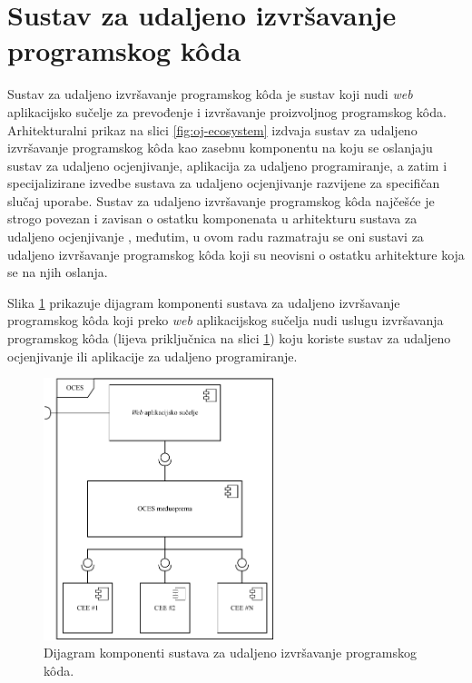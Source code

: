 \documentclass[times, utf8, diplomski]{fer}
\begin{document}
\pagebreak

\section{Sustav za udaljeno izvršavanje programskog kôda}
Sustav za udaljeno izvršavanje programskog kôda je sustav koji nudi \textit{web} aplikacijsko sučelje  za prevođenje i izvršavanje proizvoljnog programskog kôda. Arhitekturalni prikaz na slici \ref{fig:oj-ecosystem} izdvaja sustav za udaljeno izvršavanje programskog kôda kao zasebnu komponentu na koju se oslanjaju sustav za udaljeno ocjenjivanje, aplikacija za udaljeno programiranje, a zatim i specijalizirane izvedbe sustava za udaljeno ocjenjivanje razvijene za specifičan slučaj uporabe. Sustav za udaljeno izvršavanje programskog kôda najčešće je strogo povezan i zavisan o ostatku komponenata u arhitekturu sustava za udaljeno ocjenjivanje \citep{9245310}, međutim, u ovom radu razmatraju se oni sustavi za udaljeno izvršavanje programskog kôda koji su neovisni o ostatku arhitekture koja se na njih oslanja.

Slika \ref{fig:oces-architecture} prikazuje dijagram komponenti sustava za udaljeno izvršavanje programskog kôda koji preko \textit{web} aplikacijskog sučelja nudi uslugu izvršavanja programskog kôda (lijeva priključnica na slici \ref{fig:oces-architecture}) koju koriste sustav za udaljeno ocjenjivanje ili aplikacije za udaljeno programiranje. 

\begin{figure}[htb]
	\centering
	\includegraphics[width=0.6\textwidth]{images/Arhitektura OCES-a.pdf}
	\caption{
		Dijagram komponenti sustava za udaljeno izvršavanje programskog kôda.
	}
	\label{fig:oces-architecture}
\end{figure}
\end{document}
